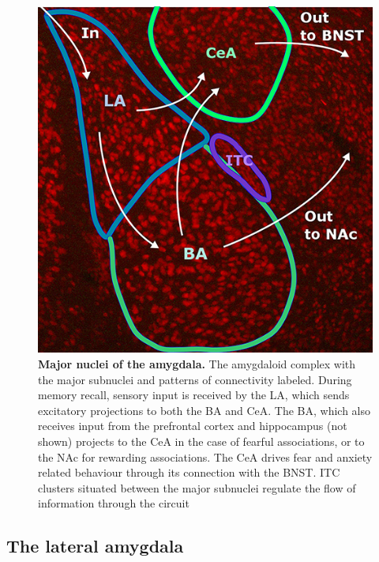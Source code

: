\documentclass[12pt,a4paperpaper,]{report}
\begin{document}
\begin{figure}[htbp]
\centering
\includegraphics{source/figures/amygdaloidcomplex.jpg}
\caption{\textbf{Major nuclei of the amygdala.} The amygdaloid complex
with the major subnuclei and patterns of connectivity labeled. During
memory recall, sensory input is received by the LA, which sends
excitatory projections to both the BA and CeA. The BA, which also
receives input from the prefrontal cortex and hippocampus (not shown)
projects to the CeA in the case of fearful associations, or to the NAc
for rewarding associations. The CeA drives fear and anxiety related
behaviour through its connection with the BNST. ITC clusters situated
between the major subnuclei regulate the flow of information through the
circuit \label{ref_a_figure}}
\end{figure}

\subsection{The lateral amygdala}\label{the-lateral-amygdala}
\end{document}
